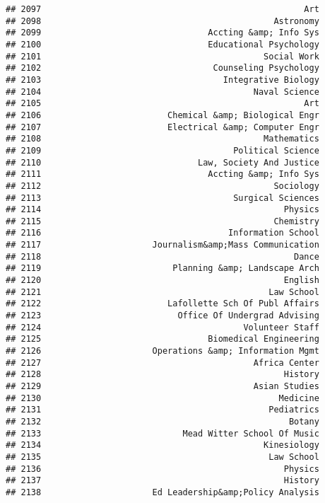 \documentclass[
]{article}
\begin{document}
\begin{verbatim}
## 2097                                                    Art
## 2098                                              Astronomy
## 2099                                 Accting &amp; Info Sys
## 2100                                 Educational Psychology
## 2101                                            Social Work
## 2102                                  Counseling Psychology
## 2103                                    Integrative Biology
## 2104                                          Naval Science
## 2105                                                    Art
## 2106                         Chemical &amp; Biological Engr
## 2107                         Electrical &amp; Computer Engr
## 2108                                            Mathematics
## 2109                                      Political Science
## 2110                               Law, Society And Justice
## 2111                                 Accting &amp; Info Sys
## 2112                                              Sociology
## 2113                                      Surgical Sciences
## 2114                                                Physics
## 2115                                              Chemistry
## 2116                                     Information School
## 2117                      Journalism&amp;Mass Communication
## 2118                                                  Dance
## 2119                          Planning &amp; Landscape Arch
## 2120                                                English
## 2121                                             Law School
## 2122                         Lafollette Sch Of Publ Affairs
## 2123                           Office Of Undergrad Advising
## 2124                                        Volunteer Staff
## 2125                                 Biomedical Engineering
## 2126                      Operations &amp; Information Mgmt
## 2127                                          Africa Center
## 2128                                                History
## 2129                                          Asian Studies
## 2130                                               Medicine
## 2131                                             Pediatrics
## 2132                                                 Botany
## 2133                            Mead Witter School Of Music
## 2134                                            Kinesiology
## 2135                                             Law School
## 2136                                                Physics
## 2137                                                History
## 2138                      Ed Leadership&amp;Policy Analysis

\end{verbatim}
\end{document}
